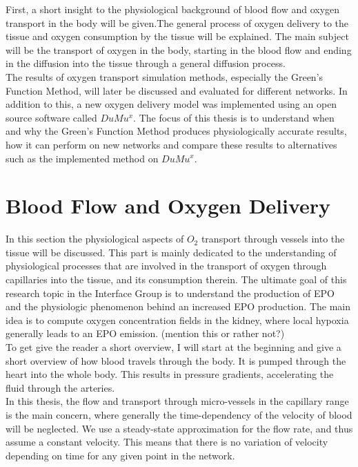 First, a short insight to the physiological background of blood flow and oxygen transport in the body will be given.The general process of oxygen delivery to the tissue and oxygen consumption by the tissue will be explained. The main subject will be the transport of oxygen in the body, starting in the blood flow and ending in the diffusion into the tissue through a general diffusion process.
\\The results of oxygen transport simulation methods, especially the Green's Function Method, will later be discussed and evaluated for different networks. In addition to this, a new oxygen delivery model was implemented using an open source software called $DuMu^x$. The focus of this thesis is to understand when and why the Green's Function Method produces physiologically accurate results, how it can perform on new networks and compare these results to alternatives such as the implemented method on $DuMu^x$.

\newpage
\section{Blood Flow and Oxygen Delivery}

In this section the physiological aspects of $O_2$ transport through vessels into the tissue will be discussed. This part is mainly dedicated to the understanding of physiological processes that are involved in the transport of oxygen through capillaries into the tissue, and its consumption therein. The ultimate goal of this research topic in the Interface Group is to understand the production of EPO and the physiologic phenomenon behind an increased EPO production. The main idea is to compute oxygen concentration fields in the kidney, where local hypoxia generally leads to an EPO emission. (mention this or rather not?)
\\To get give the reader a short overview, I will start at the beginning and give a short overview of how blood travels through the body. It is pumped through the heart into the whole body. This results in pressure gradients, accelerating the fluid through the arteries.
\\In this thesis, the flow and transport through micro-vessels in the capillary range is the main concern, where generally the time-dependency of the velocity of blood will be neglected. We use a steady-state approximation for the flow rate, and thus assume a constant velocity. This means that there is no variation of velocity depending on time for any given point in the network.

